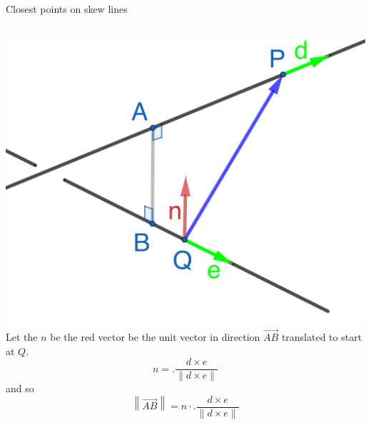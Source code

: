 \documentclass{beamer}
\begin{document}
\begin{frame}{Closest points on skew lines}
\begin{columns}
    \hspace{-1cm}
    \includegraphics[scale=0.3]{skew-distance2.png}
    Let the $n$ be the red vector be the unit vector in direction $\overrightarrow{AB}$ translated to start at $Q$.
    \begin{equation*}
    n =.\frac{d\times e}{\|d\times e\|}
    \end{equation*}
    and so
    \begin{equation*}
    \left\|\overrightarrow{AB}\right\| = n\cdot .\frac{d\times e}{\|d\times e\|}
    \end{equation*}
\end{columns}
\end{frame}
\end{document}
